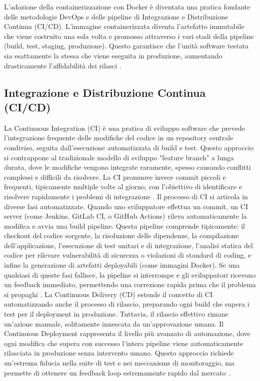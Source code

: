 \documentclass[12pt,a4paper,openright,twoside]{book}
\begin{document}
L'adozione della containerizzazione con Docker è diventata una pratica fondante delle metodologie DevOps e delle pipeline di Integrazione e Distribuzione Continua (CI/CD). L'immagine containerizzata diventa l'artefatto immutabile che viene costruito una sola volta e promosso attraverso i vari stadi della pipeline (build, test, staging, produzione). Questo garantisce che l'unità software testata sia esattamente la stessa che viene eseguita in produzione, aumentando drasticamente l'affidabilità dei rilasci \cite{shafique2024containerization}.

\subsection{Integrazione e Distribuzione Continua (CI/CD)}
La Continuous Integration (CI) è una pratica di sviluppo software che prevede l'integrazione frequente delle modifiche del codice in un repository centrale condiviso, seguita dall'esecuzione automatizzata di build e test. Questo approccio si contrappone al tradizionale modello di sviluppo "feature branch" a lunga durata, dove le modifiche vengono integrate raramente, spesso causando conflitti complessi e difficili da risolvere. La CI promuove invece commit piccoli e frequenti, tipicamente multiple volte al giorno, con l'obiettivo di identificare e risolvere rapidamente i problemi di integrazione \cite{Rahman_2018}.
Il processo di CI si articola in diverse fasi automatizzate. Quando uno sviluppatore effettua un commit, un CI server (come Jenkins, GitLab CI, o GitHub Actions) rileva automaticamente la modifica e avvia una build pipeline. Questa pipeline comprende tipicamente: il checkout del codice sorgente, la risoluzione delle dipendenze, la compilazione dell'applicazione, l'esecuzione di test unitari e di integrazione, l'analisi statica del codice per rilevare vulnerabilità di sicurezza o violazioni di standard di coding, e infine la generazione di artefatti deployabili (come immagini Docker). Se una qualsiasi di queste fasi fallisce, la pipeline si interrompe e gli sviluppatori ricevono un feedback immediato, permettendo una correzione rapida prima che il problema si propaghi \cite{ghaleb2019empirical}.
La Continuous Delivery (CD) estende il concetto di CI automatizzando anche il processo di rilascio, preparando ogni build che supera i test per il deployment in produzione. Tuttavia, il rilascio effettivo rimane un'azione manuale, solitamente innescata da un'approvazione umana. Il Continuous Deployment rappresenta il livello più avanzato di automazione, dove ogni modifica che supera con successo l'intera pipeline viene automaticamente rilasciata in produzione senza intervento umano. Questo approccio richiede un'estrema fiducia nella suite di test e nei meccanisms di monitoraggio, ma permette di ottenere un feedback loop estremamente rapido dal mercato \cite{teixeira2020systematic}.
\end{document}
